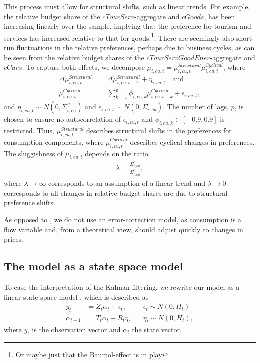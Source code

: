 This process must allow for structural shifts, such as linear trends. For example, the relative budget share of the $cTourServ$-aggregate and $cGoods$, has been increasing linearly over the sample, implying that the preference for tourism and services has increased relative to that for goods.\footnote{Or maybe just that the Baumol-effect is in play}. There are seemingly also short-run fluctuations in the relative preferences, perhaps due to business cycles, as can be seen from the relative budget shares of the $cTourServGoodEner$-aggregate and $cCars$. To capture both effects, we decompose $\mu_{i,cu,t}= \mu_{i,cu,t}^{Structural} \mu_{i,cu,t}^{Cyclical}$, where 
\begin{align}\label{mustruceq}
    \Delta \mu_{i,cu,t}^{Structural} &= \Delta \mu_{i,cu,t-1}^{Structural} + \eta_{i,cu,t} \quad \text{and} \\ \label{mucyceq}
    \mu_{i,cu,t}^{Cyclical} &= \sum_{k=1}^p \phi_{i,cu,k}\mu_{i,cu,t-k}^{Cyclical} + \epsilon_{i,cu,t},
\end{align}
and $\eta_{i,cu,t} \sim N(0,\Sigma^{\eta}_{i,cu})$ and $\epsilon_{i,cu,t}\sim N(0,\Sigma^{\epsilon}_{i,cu})$, The number of lags, $p$, is chosen to ensure no autocorrelation of $\epsilon_{i,cu,t}$ and $\phi_{i,cu,k} \in [-0.9,0.9]$ is restricted. Thus, $\mu_{i,cu,t}^{Structural}$ describes structural shifts in the preferences for consumption components, where $\mu_{i,cu,t}^{Cyclical}$ describes cyclical changes in preferences. The sluggishness of $\mu_{i,cu,t}$ depends on the ratio
\begin{align}
    \lambda = \frac{\Sigma^{\epsilon}_{i,cu}}{\Sigma^{\eta}_{i,cu}},
\end{align}
where $\lambda \rightarrow \infty$ corresponds to an assumption of a linear trend and $\lambda \rightarrow 0$ corresponds to all changes in relative budget shares are due to structural preference shifts. 

As opposed to \cite{CESkalmanmethod}, we do not use an error-correction model, as consumption is a flow variable and, from a theoretical view, should adjust quickly to changes in prices. 

\subsection{The model as a state space model}
To ease the interpretation of the Kalman filtering, we rewrite our model as a linear state space model \cite[p. 43]{durbin2012time}, which is described as
\begin{align}
    y_t &= Z_t \alpha_t + \epsilon_t, \quad &\epsilon_t \sim N(0,H_t) \\ 
    \alpha_{t+1 } &= T_t \alpha_t + R_t \eta_t  \quad &\eta_t \sim N(0,H_t),
\end{align}
where $y_t$ is the observation vector and $\alpha_t$ the state vector. 

